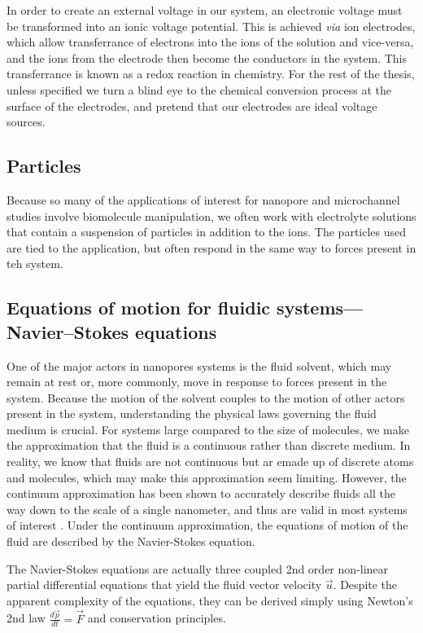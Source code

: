 			In order to create an external voltage in our system, an electronic voltage must be transformed into an ionic voltage potential. This is achieved \textit{via} ion electrodes, which allow transferrance of electrons into the ions of the solution and vice-versa, and the ions from the electrode then become the conductors in the system. This transferrance is known as a redox reaction in chemistry. For the rest of the thesis, unless specified we turn a blind eye to the chemical conversion process at the surface of the electrodes, and pretend that our electrodes are ideal voltage sources.
			
		\subsection{Particles}
		
			Because so many of the applications of interest for nanopore and microchannel studies involve biomolecule manipulation, we often work with electrolyte solutions that contain a suspension of particles in addition to the ions. The particles used are tied to the application, but often respond in the same way to forces present in teh system.

		\subsection{Equations of motion for fluidic systems---Navier--Stokes equations}
		
			One of the major actors in nanopores systems is the fluid solvent, which may remain at rest or, more commonly, move in response to forces present in the system. Because the motion of the solvent couples to the motion of other actors present in the system, understanding the physical laws governing the fluid medium is crucial. For systems large compared to the size of molecules, we make the approximation that the fluid is a continuous rather than discrete medium. In reality, we know that fluids are not continuous but ar emade up of discrete atoms and molecules, which may make this approximation seem limiting. However, the continuum approximation has been shown to accurately describe fluids all the way down to the scale of a single nanometer, and thus are valid in most systems of interest \cite{Bocquet2012}. Under the continuum approximation, the equations of motion of the fluid are described by the Navier-Stokes equation.
			
			The Navier-Stokes equations are actually three coupled 2nd order non-linear partial differential equations that yield the fluid vector velocity $\vec{u}$. Despite the apparent complexity of the equations, they can be derived simply using Newton's 2nd law $\frac{d\vec{p}}{dt}=\vec{F}$ and conservation principles.
			
